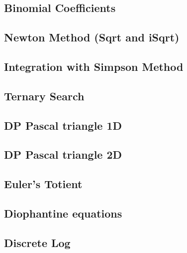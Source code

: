 \documentclass[10pt]{article}
\begin{document}
\begin{multicols*}{2}
\subsection{Binomial Coefficients}


\subsection{Newton Method (Sqrt and iSqrt)}


\subsection{Integration with Simpson Method}


\subsection{Ternary Search}


\subsection{DP Pascal triangle 1D}


\subsection{DP Pascal triangle 2D}


\subsection{Euler's Totient}


\subsection{Diophantine equations}


\subsection{Discrete Log}



\end{multicols*}
\end{document}
